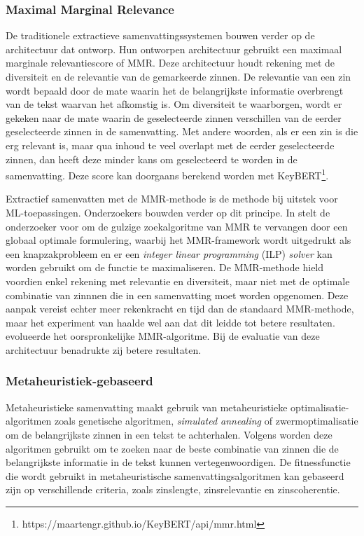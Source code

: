 
\subsubsection{Maximal Marginal Relevance}

De traditionele extractieve samenvattingssystemen bouwen verder op de architectuur dat \textcite{Carbonell1998} ontworp. Hun ontworpen architectuur gebruikt een maximaal marginale relevantiescore of MMR. Deze architectuur houdt rekening met de diversiteit en de relevantie van de gemarkeerde zinnen. De relevantie van een zin wordt bepaald door de mate waarin het de belangrijkste informatie overbrengt van de tekst waarvan het afkomstig is. Om diversiteit te waarborgen, wordt er gekeken naar de mate waarin de geselecteerde zinnen verschillen van de eerder geselecteerde zinnen in de samenvatting. Met andere woorden, als er een zin is die erg relevant is, maar qua inhoud te veel overlapt met de eerder geselecteerde zinnen, dan heeft deze minder kans om geselecteerd te worden in de samenvatting. Deze score kan doorgaans berekend worden met KeyBERT\footnote{https://maartengr.github.io/KeyBERT/api/mmr.html}.

Extractief samenvatten met de MMR-methode is de methode bij uitstek voor ML-toepassingen. Onderzoekers bouwden verder op dit principe. In \textcite{McDonald2007} stelt de onderzoeker voor om de gulzige zoekalgoritme van MMR te vervangen door een globaal optimale formulering, waarbij het MMR-framework wordt uitgedrukt als een knapzakprobleem en er een \textit{integer linear programming} (ILP) \textit{solver} kan worden gebruikt om de functie te maximaliseren. De MMR-methode hield voordien enkel rekening met relevantie en diversiteit, maar niet met de optimale combinatie van zinnnen die in een samenvatting moet worden opgenomen. Deze aanpak vereist echter meer rekenkracht en tijd dan de standaard MMR-methode, maar het experiment van \textcite{McDonald2007} haalde wel aan dat dit leidde tot betere resultaten. \textcite{Lin2010} evolueerde het oorspronkelijke MMR-algoritme. Bij de evaluatie van deze architectuur benadrukte zij betere resultaten. 

\subsubsection{Metaheuristiek-gebaseerd}

Metaheuristieke samenvatting maakt gebruik van metaheuristieke optimalisatie-algoritmen zoals genetische algoritmen, \textit{simulated annealing} of zwermoptimalisatie om de belangrijkste zinnen in een tekst te achterhalen. Volgens \textcite{Verma2020} \textcite{Premjith2015} worden deze algoritmen gebruikt om te zoeken naar de beste combinatie van zinnen die de belangrijkste informatie in de tekst kunnen vertegenwoordigen. De fitnessfunctie die wordt gebruikt in metaheuristische samenvattingsalgoritmen kan gebaseerd zijn op verschillende criteria, zoals zinslengte, zinsrelevantie en zinscoherentie.

